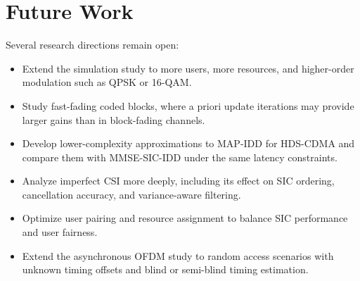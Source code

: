 \section{Future Work}

Several research directions remain open:
\begin{itemize}
    \item Extend the simulation study to more users, more resources, and higher-order modulation such as QPSK or 16-QAM.
    \item Study fast-fading coded blocks, where a priori update iterations may provide larger gains than in block-fading channels.
    \item Develop lower-complexity approximations to MAP-IDD for HDS-CDMA and compare them with MMSE-SIC-IDD under the same latency constraints.
    \item Analyze imperfect CSI more deeply, including its effect on SIC ordering, cancellation accuracy, and variance-aware filtering.
    \item Optimize user pairing and resource assignment to balance SIC performance and user fairness.
    \item Extend the asynchronous OFDM study to random access scenarios with unknown timing offsets and blind or semi-blind timing estimation.
\end{itemize}
